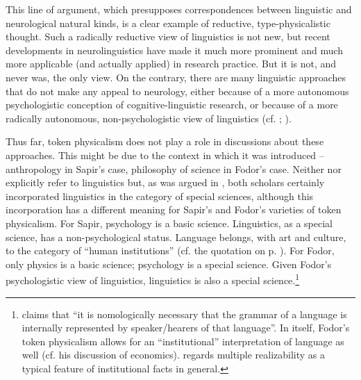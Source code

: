 \documentclass[output=paper]{langscibook}
\begin{document}
This line of argument, which presupposes correspondences between linguistic and neurological natural kinds, is a clear example of reductive, type-physicalistic thought. Such a radically reductive view of linguistics is not new, but recent developments in neurolinguistics have made it much more prominent and much more applicable (and actually applied) in research practice. But it is not, and never was, the only view. On the contrary, there are many linguistic approaches that do not make any appeal to neurology, either because of a more autonomous psychologistic conception of cognitive-linguistic research, or because of a more radically autonomous, non-psychologistic view of linguistics (cf. \citealt{Botha1992}; \citealt{Elffers2014}).

Thus far, token physicalism does not play a role in discussions about these approaches. This might be due to the context in which it was introduced -- anthropology in Sapir's case, philosophy of science in Fodor's case. Neither \citet{Sapir1917} nor \citet{Fodor1974} explicitly refer to linguistics but, as was argued in , both scholars certainly incorporated linguistics in the category of special sciences, although this incorporation has a different meaning for Sapir's and Fodor's varieties of token physicalism. For Sapir, psychology is a basic science. Linguistics, as a special science, has a non-psychological status. Language belongs, with art and culture, to the category of ``human institutions'' (cf. the quotation on p. \pageref{q:elffers:huminst}). For Fodor, only physics is a basic science; psychology is a special science. Given Fodor's psychologistic view of linguistics, linguistics is also a special science.\footnote{\citet[149]{Fodor1985} claims that ``it is nomologically necessary that the grammar of a language is internally represented by speaker/hearers of that language''. In itself, Fodor's token physicalism allows for an ``institutional'' interpretation of language as well (cf. his discussion of economics). \citet[422--423]{Jones2004} regards multiple realizability as a typical feature of institutional facts in general.\label{fn:elffers:nomologically}}
\end{document}
